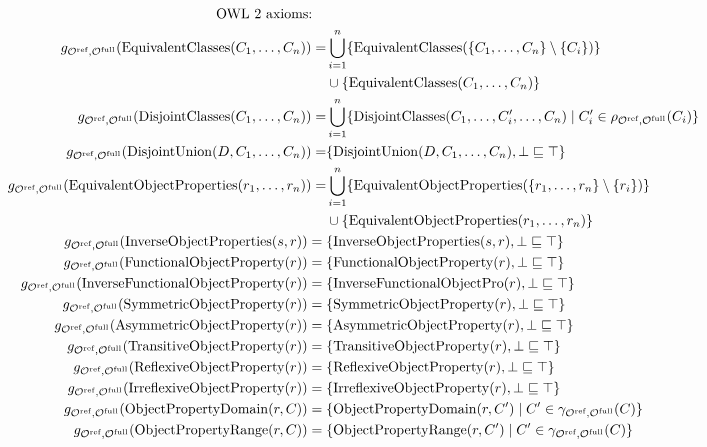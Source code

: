 {\begin{align*}
  \text{OWL 2 axioms:} \quad & \\
  g_{{\mathcal{O}^\textnormal{ref}},{\mathcal{O}^\textnormal{full}}}(\mathrm{EquivalentClasses}(C_1, \dots, C_n)) = & \bigcup_{i=1}^n \{ \mathrm{EquivalentClasses}(\{C_1, \dots, C_n\} \setminus \{C_i\}) \} \\& \cup \{ \mathrm{EquivalentClasses}(C_1, \dots, C_n) \} \\
  g_{{\mathcal{O}^\textnormal{ref}},{\mathcal{O}^\textnormal{full}}}(\mathrm{DisjointClasses}(C_1, \dots, C_n)) = & \bigcup_{i=1}^n \{ \mathrm{DisjointClasses}(C_1, \dots, C_i', \dots, C_n) \mid C_i' \in \rho_{{\mathcal{O}^\textnormal{ref}},{\mathcal{O}^\textnormal{full}}}(C_i) \} \\
  g_{{\mathcal{O}^\textnormal{ref}},{\mathcal{O}^\textnormal{full}}}(\mathrm{DisjointUnion}(D, C_1, \dots, C_n)) = & \{ \mathrm{DisjointUnion}(D, C_1, \dots, C_n), \bot \sqsubseteq \top \} \\
  g_{{\mathcal{O}^\textnormal{ref}},{\mathcal{O}^\textnormal{full}}}(\mathrm{EquivalentObjectProperties}(r_1, \dots, r_n)) = & \bigcup_{i=1}^n \{ \mathrm{EquivalentObjectProperties}(\{r_1, \dots, r_n\} \setminus \{r_i\}) \} \\& \cup \{ \mathrm{EquivalentObjectProperties}(r_1, \dots, r_n) \} \\
  g_{{\mathcal{O}^\textnormal{ref}},{\mathcal{O}^\textnormal{full}}}(\mathrm{InverseObjectProperties}(s, r)) ={} & \{ \mathrm{InverseObjectProperties}(s, r), \bot \sqsubseteq \top \} \\
  g_{{\mathcal{O}^\textnormal{ref}},{\mathcal{O}^\textnormal{full}}}(\mathrm{FunctionalObjectProperty}(r)) ={} & \{ \mathrm{FunctionalObjectProperty}(r), \bot \sqsubseteq \top \} \\
  g_{{\mathcal{O}^\textnormal{ref}},{\mathcal{O}^\textnormal{full}}}(\mathrm{InverseFunctionalObjectProperty}(r)) ={} & \{ \mathrm{InverseFunctionalObjectPro}(r), \bot \sqsubseteq \top \} \\
  g_{{\mathcal{O}^\textnormal{ref}},{\mathcal{O}^\textnormal{full}}}(\mathrm{SymmetricObjectProperty}(r)) ={} & \{ \mathrm{SymmetricObjectProperty}(r), \bot \sqsubseteq \top \} \\
  g_{{\mathcal{O}^\textnormal{ref}},{\mathcal{O}^\textnormal{full}}}(\mathrm{AsymmetricObjectProperty}(r)) ={} & \{ \mathrm{AsymmetricObjectProperty}(r), \bot \sqsubseteq \top \} \\
  g_{{\mathcal{O}^\textnormal{ref}},{\mathcal{O}^\textnormal{full}}}(\mathrm{TransitiveObjectProperty}(r)) ={} & \{ \mathrm{TransitiveObjectProperty}(r), \bot \sqsubseteq \top \} \\
  g_{{\mathcal{O}^\textnormal{ref}},{\mathcal{O}^\textnormal{full}}}(\mathrm{ReflexiveObjectProperty}(r)) ={} & \{ \mathrm{ReflexiveObjectProperty}(r), \bot \sqsubseteq \top \} \\
  g_{{\mathcal{O}^\textnormal{ref}},{\mathcal{O}^\textnormal{full}}}(\mathrm{IrreflexiveObjectProperty}(r)) ={} & \{ \mathrm{IrreflexiveObjectProperty}(r), \bot \sqsubseteq \top \} \\
  g_{{\mathcal{O}^\textnormal{ref}},{\mathcal{O}^\textnormal{full}}}(\mathrm{ObjectPropertyDomain}(r, C)) ={} & \{\mathrm{ObjectPropertyDomain}(r, C') \mid C' \in \gamma_{{\mathcal{O}^\textnormal{ref}},{\mathcal{O}^\textnormal{full}}} (C)\} \\
  g_{{\mathcal{O}^\textnormal{ref}},{\mathcal{O}^\textnormal{full}}}(\mathrm{ObjectPropertyRange}(r, C)) ={} & \{\mathrm{ObjectPropertyRange}(r, C') \mid C' \in \gamma_{{\mathcal{O}^\textnormal{ref}},{\mathcal{O}^\textnormal{full}}} (C)\}
\end{align*}
}

